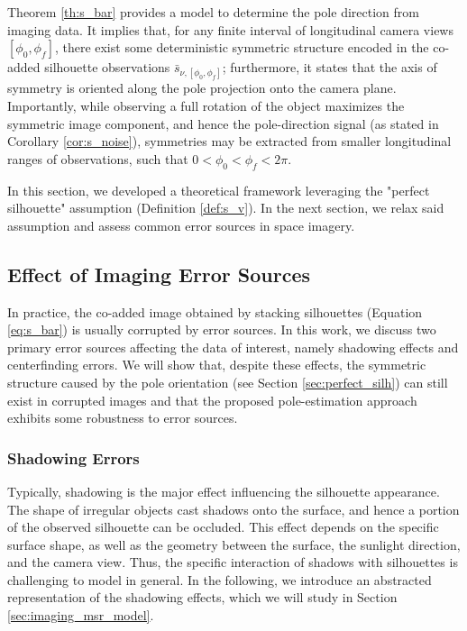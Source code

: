 Theorem \ref{th:s_bar} provides a model to determine the pole direction from imaging data. It implies that, for any finite interval of longitudinal camera views $[\phi_0,\phi_f]$, there exist some deterministic symmetric structure encoded in the co-added silhouette observations $\bar{s}_{\nu,[\phi_0,\phi_f]}$; furthermore, it states that the axis of symmetry is oriented along the pole projection onto the camera plane. Importantly, while observing a full rotation of the object maximizes the symmetric image component, and hence the pole-direction signal (as stated in Corollary \ref{cor:s_noise}), symmetries may be extracted from smaller longitudinal ranges of observations, such that $0 < \phi_0 < \phi_f < 2\pi$.

In this section, we developed a theoretical framework leveraging the "perfect silhouette" assumption (Definition \ref{def:s_v}). In the next section, we relax said assumption and assess common error sources in space imagery.

\subsection{Effect of Imaging Error Sources}

In practice, the co-added image obtained by stacking silhouettes (Equation \ref{eq:s_bar}) is usually corrupted by error sources. In this work, we discuss two primary error sources affecting the data of interest, namely shadowing effects and centerfinding errors. We will show that, despite these effects, the symmetric structure caused by the pole orientation  (see Section \ref{sec:perfect_silh}) can still exist in corrupted images and that the proposed pole-estimation approach exhibits some robustness to error sources.

\subsubsection{Shadowing Errors}

Typically, shadowing is the major effect influencing the silhouette appearance. The shape of irregular objects cast shadows onto the surface, and hence a portion of the observed silhouette can be occluded. This effect depends on the specific surface shape, as well as the geometry between the surface, the sunlight direction, and the camera view. Thus, the specific interaction of shadows with silhouettes is challenging to model in general. In the following, we introduce an abstracted representation of the shadowing effects, which we will study in Section \ref{sec:imaging_msr_model}.

